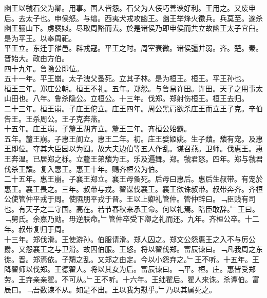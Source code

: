 \documentclass{zhvt-classic}
\begin{document}
\hspace*{2em}幽王以虢石父为卿。用事。国人皆怨。石父为人佞巧善谀好利。王用之。又废申后。去太子也。申侯怒。与缯。西夷犬戎攻幽王。幽王举烽火徵兵。兵莫至。遂杀幽王骊山下。虏襃姒。尽取周赂而去。於是诸侯乃即申侯而共立故幽王太子宜臼。是为平王。以奉周祀。\\
\hspace*{2em}平王立。东迁于雒邑。辟戎寇。平王之时。周室衰微。诸侯彊并弱。齐。楚。秦。晋始大。政由方伯。\\
\hspace*{2em}四十九年。鲁隐公即位。\\
\hspace*{2em}五十一年。平王崩。太子洩父蚤死。立其子林。是为桓王。桓王。平王孙也。\\
\hspace*{2em}桓王三年。郑庄公朝。桓王不礼。五年。郑怨。与鲁易许田。许田。天子之用事太山田也。八年。鲁杀隐公。立桓公。十三年。伐郑。郑射伤桓王。桓王去归。\\
\hspace*{2em}二十三年。桓王崩。子庄王佗立。庄王四年。周公黑肩欲杀庄王而立王子克。辛伯告王。王杀周公。王子克奔燕。\\
\hspace*{2em}十五年。庄王崩。子釐王胡齐立。釐王三年。齐桓公始霸。\\
\hspace*{2em}五年。釐王崩。子惠王阆立。惠王二年。初。庄王嬖姬姚。生子穨。穨有宠。及惠王即位。夺其大臣园以为囿。故大夫边伯等五人作乱。谋召燕。卫师。伐惠王。惠王奔温。已居郑之栎。立釐王弟穨为王。乐及遍舞。郑。虢君怒。四年。郑与虢君伐杀王穨。复入惠王。惠王十年。赐齐桓公为伯。\\
\hspace*{2em}二十五年。惠王崩。子襄王郑立。襄王母蚤死。后母曰惠后。惠后生叔带。有宠於惠王。襄王畏之。三年。叔带与戎。翟谋伐襄王。襄王欲诛叔带。叔带奔齐。齐桓公使管仲平戎于周。使隰朋平戎于晋。王以上卿礼管仲。管仲辞曰。﹁臣贱有司也。有天子之二守国。高在。若节春秋来承王命。何以礼焉。陪臣敢辞。﹂王曰。﹁舅氏。余嘉乃勋。毋逆朕命。﹂管仲卒受下卿之礼而还。九年。齐桓公卒。十二年。叔带复归于周。\\
\hspace*{2em}十三年。郑伐滑。王使游孙。伯服请滑。郑人囚之。郑文公怨惠王之入不与厉公爵。又怨襄王之与卫滑。故囚伯服。王怒。将以翟伐郑。富辰谏曰。﹁凡我周之东徙。晋。郑焉依。子穨之乱。又郑之由定。今以小怨弃之。﹂王不听。十五年。王降翟师以伐郑。王德翟人。将以其女为后。富辰谏曰。﹁平。桓。庄。惠皆受郑劳。王弃亲亲翟。不可从。﹂王不听。十六年。王绌翟后。翟人来诛。杀谭伯。富辰曰。﹁吾数谏不从。如是不出。王以我为懟乎。﹂乃以其属死之。\\
\end{document}

